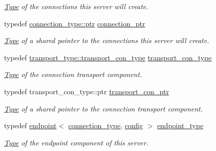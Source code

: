 \begin{DoxyCompactItemize}
\begin{DoxyCompactList}\small\item\em \mbox{\hyperlink{struct_type}{Type}} of the connections this server will create. \end{DoxyCompactList}\item 
\mbox{\label{classwebsocketpp_1_1client_a2e187bbb2beac676bbfbc2e8065de83e}} 
typedef \mbox{\hyperlink{classwebsocketpp_1_1connection_ab910d42e3bde91546183cc54642f32ab}{connection\+\_\+type\+::ptr}} \mbox{\hyperlink{classwebsocketpp_1_1client_a2e187bbb2beac676bbfbc2e8065de83e}{connection\+\_\+ptr}}
\begin{DoxyCompactList}\small\item\em \mbox{\hyperlink{struct_type}{Type}} of a shared pointer to the connections this server will create. \end{DoxyCompactList}\item 
\mbox{\label{classwebsocketpp_1_1client_af990a5c874d701129894f5cc88b69507}} 
typedef \mbox{\hyperlink{classwebsocketpp_1_1transport_1_1asio_1_1endpoint_a75f3102766fd3ba8230e99a2b0e00457}{transport\+\_\+type\+::transport\+\_\+con\+\_\+type}} \mbox{\hyperlink{classwebsocketpp_1_1client_af990a5c874d701129894f5cc88b69507}{transport\+\_\+con\+\_\+type}}
\begin{DoxyCompactList}\small\item\em \mbox{\hyperlink{struct_type}{Type}} of the connection transport component. \end{DoxyCompactList}\item 
\mbox{\label{classwebsocketpp_1_1client_a6087b4e73f1864c893e16b33017b2da6}} 
typedef transport\+\_\+con\+\_\+type\+::ptr \mbox{\hyperlink{classwebsocketpp_1_1client_a6087b4e73f1864c893e16b33017b2da6}{transport\+\_\+con\+\_\+ptr}}
\begin{DoxyCompactList}\small\item\em \mbox{\hyperlink{struct_type}{Type}} of a shared pointer to the connection transport component. \end{DoxyCompactList}\item 
\mbox{\label{classwebsocketpp_1_1client_a37e4950ce23369e6614c28612b7ef0b4}} 
typedef \mbox{\hyperlink{classwebsocketpp_1_1endpoint}{endpoint}}$<$ \mbox{\hyperlink{classwebsocketpp_1_1client_a29c9f0410ed33a331faac19f8efea874}{connection\+\_\+type}}, \mbox{\hyperlink{classconfig}{config}} $>$ \mbox{\hyperlink{classwebsocketpp_1_1client_a37e4950ce23369e6614c28612b7ef0b4}{endpoint\+\_\+type}}
\begin{DoxyCompactList}\small\item\em \mbox{\hyperlink{struct_type}{Type}} of the endpoint component of this server. \end{DoxyCompactList}\end{DoxyCompactItemize}

